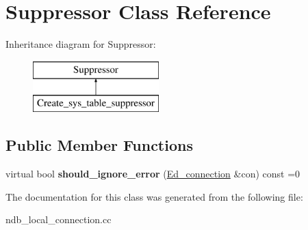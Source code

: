 \hypertarget{classSuppressor}{}\section{Suppressor Class Reference}
\label{classSuppressor}
Inheritance diagram for Suppressor\+:\begin{figure}[H]
\begin{center}
\leavevmode
\includegraphics[height=2.000000cm]{classSuppressor}
\end{center}
\end{figure}
\subsection*{Public Member Functions}
\begin{DoxyCompactItemize}
\item 
\mbox{\label{classSuppressor_a92d8e1fb4de70fa67435cab7a215eea4}} 
virtual bool {\bfseries should\+\_\+ignore\+\_\+error} (\mbox{\hyperlink{classEd__connection}{Ed\+\_\+connection}} \&con) const =0
\end{DoxyCompactItemize}


The documentation for this class was generated from the following file\+:\begin{DoxyCompactItemize}
\item 
ndb\+\_\+local\+\_\+connection.\+cc\end{DoxyCompactItemize}
